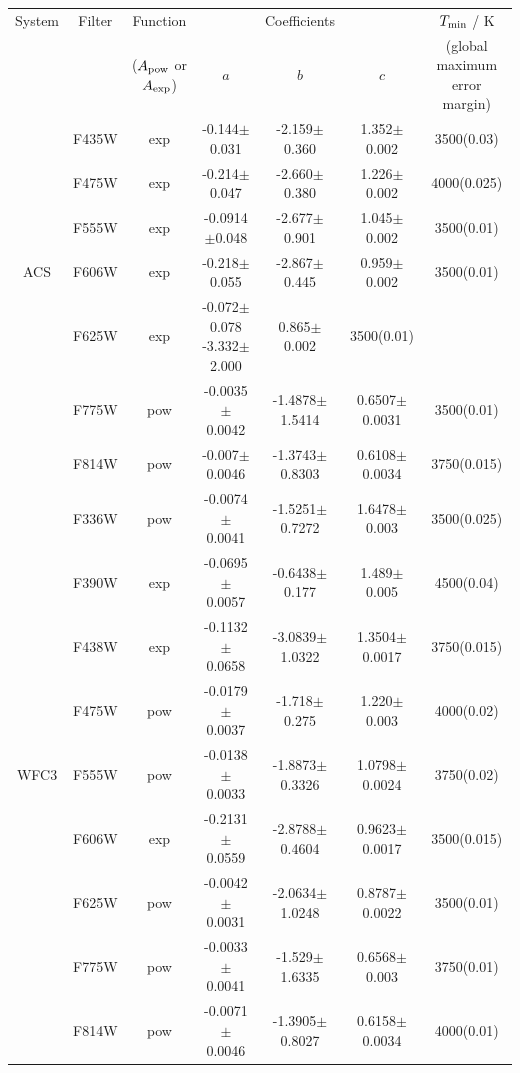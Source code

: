\documentclass[12pt, a4paper]{report}
\begin{document}
\begin{table}
\begin{center}
\begin{tabular}{ccccccc}
\hline
System & Filter &  Function & & Coefficients & & $T_{\textnormal{min}}$ / K \\
 & & ($A_{\textnormal{pow}}$ or $A_{\textnormal{exp}}$) & $a$ & $b$ & $c$ & (global maximum error margin) \\
\hline
& F435W & exp & -0.144$\pm$0.031 & -2.159$\pm$0.360 & 1.352$\pm$0.002 & 3500(0.03) \\
& F475W & exp & -0.214$\pm$0.047 & -2.660$\pm$0.380 & 1.226$\pm$0.002 & 4000(0.025) \\
& F555W & exp & -0.0914$\pm$0.048 & -2.677$\pm$0.901 & 1.045$\pm$0.002 & 3500(0.01) \\
ACS & F606W & exp & -0.218$\pm$0.055 & -2.867$\pm$0.445 & 0.959$\pm$0.002 & 3500(0.01) \\
& F625W & exp & -0.072$\pm$0.078 -3.332$\pm$2.000 & 0.865$\pm$0.002 & 3500(0.01) \\
& F775W & pow & -0.0035$\pm$0.0042 & -1.4878$\pm$1.5414 & 0.6507$\pm$0.0031 & 3500(0.01) \\
& F814W & pow & -0.007$\pm$0.0046 & -1.3743$\pm$0.8303 & 0.6108$\pm$0.0034 & 3750(0.015) \\ \hline

& F336W & pow & -0.0074$\pm$0.0041 & -1.5251$\pm$0.7272 & 1.6478$\pm$0.003 & 3500(0.025) \\
& F390W & exp & -0.0695$\pm$0.0057 & -0.6438$\pm$0.177 & 1.489$\pm$0.005 & 4500(0.04) \\
& F438W & exp & -0.1132$\pm$0.0658 & -3.0839$\pm$1.0322 & 1.3504$\pm$0.0017 & 3750(0.015) \\
& F475W & pow & -0.0179$\pm$0.0037 & -1.718$\pm$0.275 & 1.220$\pm$0.003 & 4000(0.02) \\
WFC3 & F555W & pow & -0.0138$\pm$0.0033 & -1.8873$\pm$0.3326 & 1.0798$\pm$0.0024 & 3750(0.02) \\
& F606W & exp & -0.2131$\pm$0.0559 & -2.8788$\pm$0.4604 & 0.9623$\pm$0.0017 & 3500(0.015) \\
& F625W & pow & -0.0042$\pm$0.0031 & -2.0634$\pm$1.0248 & 0.8787$\pm$0.0022 & 3500(0.01) \\
& F775W & pow & -0.0033$\pm$0.0041 & -1.529$\pm$1.6335 & 0.6568$\pm$0.003 & 3750(0.01) \\
& F814W & pow & -0.0071$\pm$0.0046 & -1.3905$\pm$0.8027 & 0.6158$\pm$0.0034 & 4000(0.01) \\ \hline


\end{tabular}
\end{center}
\end{table}
\end{document}
